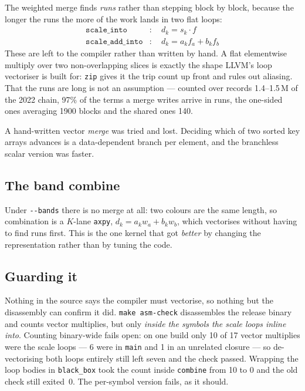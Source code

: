 \documentclass[11pt,a4paper]{article}
\newcommand{\flag}[1]{\texttt{-{}-#1}}
\begin{document}
The weighted merge finds \emph{runs} rather than stepping block by block,
because the longer the runs the more of the work lands in two flat loops:
\begin{align*}
  \texttt{scale\_into}    &: \quad d_k = s_k \cdot f \\
  \texttt{scale\_add\_into} &: \quad d_k = a_k f_a + b_k f_b
\end{align*}
These are left to the compiler rather than written by hand. A flat elementwise
multiply over two non-overlapping slices is exactly the shape LLVM's loop
vectoriser is built for: \texttt{zip} gives it the trip count up front and rules
out aliasing. That the runs are long is not an assumption --- counted over
records 1.4--1.5\,M of the 2022 chain, 97\% of the terms a merge writes arrive in
runs, the one-sided ones averaging 1900 blocks and the shared ones 140.

A hand-written vector \emph{merge} was tried and lost. Deciding which of two
sorted key arrays advances is a data-dependent branch per element, and the
branchless scalar version was faster.

\subsection{The band combine}

Under \flag{bands} there is no merge at all: two colours are the same length, so
combination is a $K$-lane \texttt{axpy}, $d_k = a_k w_a + b_k w_b$, which
vectorises without having to find runs first. This is the one kernel that got
\emph{better} by changing the representation rather than by tuning the code.

\subsection{Guarding it}

Nothing in the source says the compiler must vectorise, so nothing but the
disassembly can confirm it did. \texttt{make asm-check} disassembles the release
binary and counts vector multiplies, but only \emph{inside the symbols the scale
loops inline into}. Counting binary-wide fails open: on one build only 10 of 17
vector multiplies were the scale loops --- 6 were in \texttt{main} and 1 in an
unrelated closure --- so de-vectorising both loops entirely still left seven and
the check passed. Wrapping the loop bodies in \texttt{black\_box} took the count
inside \texttt{combine} from 10 to 0 and the old check still exited~0. The
per-symbol version fails, as it should.
\end{document}
